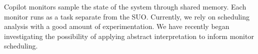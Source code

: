 Copilot monitors sample the state of the system through shared
memory. Each monitor runs as a task separate from the SUO.  
  Currently, we rely on scheduling analysis with a good amount of
  experimentation. We have recently began investigating the
  possibility of applying  abstract
  interpretation to inform monitor scheduling. 


 

  

